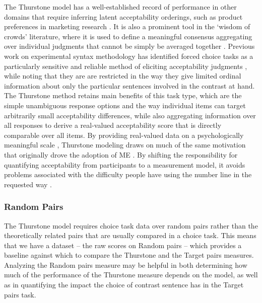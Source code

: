 \documentclass[doc]{apa6}
\newcommand{\targchoice}{{\sc Target pairs}}
\newcommand{\rndchoice}{{\sc Random pairs}}
\newcommand{\ME}{{\sc ME}}%
\newcommand{\thurstone}{{\sc Thurstone}}
\newcommand{\choicetask}{choice task}
\begin{document}
The \thurstone{} model has a well-established record of performance in other domains that require inferring latent acceptability orderings, such as product preferences in marketing research \citep{omahony2003foodprefs,ennis2016thurstonianmodels}.
It is also a prominent tool in the `wisdom of crowds' literature, where it is used to define a meaningful consensus aggregating over individual judgments that cannot be simply be averaged together \citep{miller2009wisdomofcrowds,selker2017thurstonian_topnlists}. Previous work on experimental syntax methodology has identified forced choice tasks as a particularly sensitive and reliable method of eliciting acceptability judgments \citep{sprouse2013formalinformal,schutze2014judgmentdata}, while noting that they are are restricted in the way they give limited ordinal information about only the particular sentences involved in the contrast at hand. The \thurstone{} method retains main benefits of this task type, which are the simple unambiguous response options and the way individual items can target arbitrarily small acceptability differences, while also aggregating information over all responses to derive a real-valued acceptability score that is directly comparable over all items. By providing real-valued data on a psychologically meaningful scale \citep{borg2005modernMDSbook,nosofsky1992similarityscaling},
\thurstone{} modeling draws on much of the same motivation that originally drove the adoption of \ME{} \citep{schutze2011linguisticevidence}. By shifting the responsibility for quantifying acceptability from participants to a measurement model, it avoids problems associated with the difficulty people have using the number line in the requested way \citep{sprouse2008nonlinear, sprouse2011commutativity}.

\subsubsection{Random Pairs}
The \thurstone{} model requires \choicetask{ }data over random pairs rather than the theoretically related pairs that are usually compared in a \choicetask. This means that we have a dataset -- the raw scores on \rndchoice{} -- which provides a baseline against which to compare the \thurstone{} and the \targchoice{} measures. Analyzing the \rndchoice{} measure may be helpful in both determining how much of the performance of the \thurstone{} measure depends on the model, as well as in quantifying the impact the  choice of contrast sentence has in the \targchoice{} task.
\end{document}
